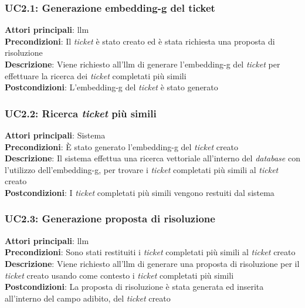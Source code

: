 \subsubsection{UC2.1: Generazione \gls{embedding-g} del ticket}
\textbf{Attori principali}: \gls{llm} \\
\textbf{Precondizioni}: Il \textit{ticket} è stato creato ed è stata richiesta una proposta di risoluzione \\
\textbf{Descrizione}: Viene richiesto all'\gls{llm} di generare l'\gls{embedding-g} del \textit{ticket} per effettuare la ricerca dei \textit{ticket} completati più simili \\
\textbf{Postcondizioni}: L'\gls{embedding-g} del \textit{ticket} è stato generato \\

\subsubsection{UC2.2: Ricerca \textit{ticket} più simili}
\textbf{Attori principali}: Sistema \\ 
\textbf{Precondizioni}: È stato generato l'\gls{embedding-g} del \textit{ticket} creato\\
\textbf{Descrizione}: Il sistema effettua una ricerca vettoriale all'interno del \textit{database} con l'utilizzo dell'\gls{embedding-g}, per trovare i \textit{ticket} completati più simili al \textit{ticket} creato \\
\textbf{Postcondizioni}: I \textit{ticket} completati più simili vengono restuiti dal sistema \\

\subsubsection{UC2.3: Generazione proposta di risoluzione}
\textbf{Attori principali}: \gls{llm} \\
\textbf{Precondizioni}: Sono stati restituiti i \textit{ticket} completati più simili al \textit{ticket} creato \\
\textbf{Descrizione}: Viene richiesto all'\gls{llm} di generare una proposta di risoluzione per il \textit{ticket} creato usando come contesto i \textit{ticket} completati più simili \\
\textbf{Postcondizioni}: La proposta di risoluzione è stata generata ed inserita all'interno del campo adibito, del \textit{ticket} creato \\

